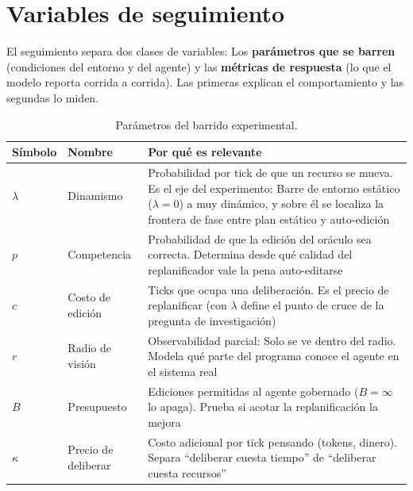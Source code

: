 
\section{Variables de seguimiento}


El seguimiento separa dos clases de variables: Los \textbf{parámetros que se barren}
(condiciones del entorno y del agente) y las \textbf{métricas de respuesta} (lo que el
modelo reporta corrida a corrida). Las primeras explican el comportamiento y las segundas lo miden.

\begin{table}[ht]
\centering
\small
\begin{tabular}{@{}l L{2.2cm} L{6.2cm}@{}}
\toprule
\textbf{Símbolo} & \textbf{Nombre} & \textbf{Por qué es relevante} \\
\midrule
$\lambda$ & Dinamismo & Probabilidad por tick de que un recurso se mueva. Es el eje del
experimento: Barre de entorno estático ($\lambda=0$) a muy dinámico, y sobre él se
localiza la frontera de fase entre plan estático y auto-edición \\
$p$ & Competencia & Probabilidad de que la edición del oráculo sea correcta. Determina
desde qué calidad del replanificador vale la pena auto-editarse \\
$c$ & Costo de edición & Ticks que ocupa una deliberación. Es el precio de replanificar
(con $\lambda$ define el punto de cruce de la pregunta de investigación) \\
$r$ & Radio de visión & Observabilidad parcial: Solo se ve dentro del radio. Modela qué
parte del programa conoce el agente en el sistema real \\
$B$ & Presupuesto & Ediciones permitidas al agente gobernado ($B=\infty$ lo apaga).
Prueba si acotar la replanificación la mejora \\
$\kappa$ & Precio de deliberar & Costo adicional por tick pensando (tokens, dinero).
Separa ``deliberar cuesta tiempo'' de ``deliberar cuesta recursos'' \\
\bottomrule
\end{tabular}
\caption{Parámetros del barrido experimental.}
\end{table}


